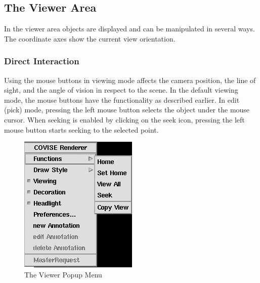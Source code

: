\clearpage

\subsection{The Viewer Area}

In the viewer area objects are displayed and can be manipulated in several ways.
The coordinate axes show the current view orientation.

\subsubsection{Direct Interaction}

Using the mouse buttons in viewing mode affects the camera position, the line of
sight, and the angle of vision in respect to the scene. In the default viewing mode,
the mouse buttons have the functionality as described earlier. In edit (pick)
mode, pressing the left mouse button selects the object under the mouse cursor.
When seeking is enabled by clicking on the seek icon, pressing the left mouse
button starts seeking to the selected point.


 \latexonly
 \begin{figure}[htp]
  \begin{center}
   \includegraphics[scale=0.7]{renderer/pict/popup}
   \caption{The Viewer Popup Menu}
	\label{fig51}
  \end{center}
 \end{figure}
 \endlatexonly


